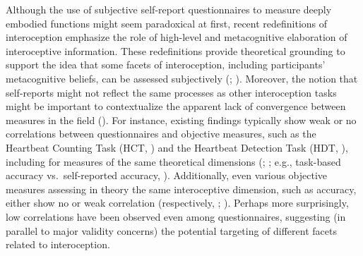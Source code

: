 \documentclass[
  jou,
  floatsintext,
  longtable,
  nolmodern,
  notxfonts,
  notimes,
  colorlinks=true,linkcolor=blue,citecolor=blue,urlcolor=blue]{apa7}
\begin{document}
Although the use of subjective self-report questionnaires to measure
deeply embodied functions might seem paradoxical at first, recent
redefinitions of interoception emphasize the role of high-level and
metacognitive elaboration of interoceptive information. These
redefinitions provide theoretical grounding to support the idea that
some facets of interoception, including participants' metacognitive
beliefs, can be assessed subjectively
(;
).
Moreover, the notion that self-reports might not reflect the same
processes as other interoception tasks might be important to
contextualize the apparent lack of convergence between measures in the
field (). For
instance, existing findings typically show weak or no correlations
between questionnaires and objective measures, such as the Heartbeat
Counting Task (HCT, )
and the Heartbeat Detection Task (HDT,
),
including for measures of the same theoretical dimensions
(;
; e.g., task-based accuracy
vs.~self-reported accuracy, ). Additionally, even various objective measures assessing in
theory the same interoceptive dimension, such as accuracy, either show
no or weak correlation (respectively, ; ). Perhaps more surprisingly, low correlations have been observed
even among questionnaires, suggesting (in parallel to major validity
concerns) the potential targeting of different facets related to
interoception.
\end{document}
